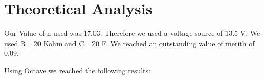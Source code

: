 \section{Theoretical Analysis}
\label{sec:analysis}

Our Value of n used was 17.03.
Therefore we used a voltage source of 13.5 V.
We used R= 20 Kohm and C= 20 F.
We reached an outstanding value of merith of 0.09.


Using Octave we reached the following results: